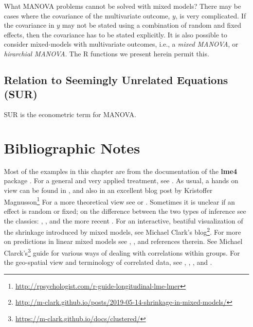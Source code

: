 \documentclass[]{book}
\renewcommand{\href}[2]{#2\footnote{\url{#1}}}
\theoremstyle{definition}
\theoremstyle{definition}
\theoremstyle{definition}
\theoremstyle{remark}
\begin{document}
What MANOVA problems cannot be solved with mixed models?
There may be cases where the covariance of the multivariate outcome, \(y\), is very complicated.
If the covariance in \(y\) may not be stated using a combination of random and fixed effects, then the covariance has to be stated explicitly.
It is also possible to consider mixed-models with multivariate outcomes, i.e., a \emph{mixed MANOVA}, or \emph{hirarchial MANOVA}.
The R functions we present herein permit this.

\hypertarget{relation-to-seemingly-unrelated-equations-sur}{%
\subsection{Relation to Seemingly Unrelated Equations (SUR)}\label{relation-to-seemingly-unrelated-equations-sur}}

SUR is the econometric term for MANOVA.

\hypertarget{bibliographic-notes-6}{%
\section{Bibliographic Notes}\label{bibliographic-notes-6}}

Most of the examples in this chapter are from the documentation of the \textbf{lme4} package \citep{lme4}.
For a general and very applied treatment, see \citet{pinero2000mixed}.
As usual, a hands on view can be found in \citet{venables2013modern}, and also in an excellent blog post by \href{http://rpsychologist.com/r-guide-longitudinal-lme-lmer}{Kristoffer Magnusson}
For a more theoretical view see \citet{weiss2005modeling} or \citet{searle2009variance}.
Sometimes it is unclear if an effect is random or fixed; on the difference between the two types of inference see the classics: \citet{eisenhart1947assumptions}, \citet{kempthorne1975fixed}, and the more recent \citet{rosset2018fixed}.
For an interactive, beatiful visualization of the shrinkage introduced by mixed models, see \href{http://m-clark.github.io/posts/2019-05-14-shrinkage-in-mixed-models/}{Michael Clark's blog}.
For more on predictions in linear mixed models see \citet{robinson1991blup}, \citet{rabinowicz2018assessing}, and references therein.
See \href{https://m-clark.github.io/docs/clustered/}{Michael Clarck's} guide for various ways of dealing with correlations within groups.
For the geo-spatial view and terminology of correlated data, see \citet{christakos2000modern}, \citet{diggle1998model}, \citet{allard2013j}, and \citet{cressie2015statistics}.
\end{document}
